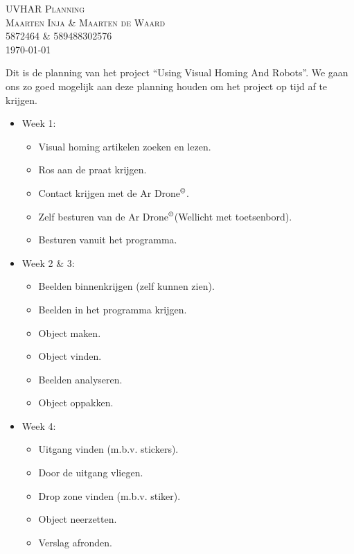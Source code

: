 \documentclass[10pt, titlepage, oneside, a4paper]{article}
\begin{document}
\newcommand{\Ardrone}{Ar Drone$^{\copyright}$}
\begin{center}
\textsc{\LARGE UVHAR Planning}\\[10pt]
\textsc{\Large Maarten Inja \& Maarten de Waard}\\[10pt]
\textsc{\large 5872464 \& 589488302576}\\
{\large \today}
\end{center}

Dit is de planning van het project ``Using Visual Homing And Robots''. We gaan ons zo goed mogelijk aan deze planning houden om het project op tijd af te krijgen.

\begin{itemize}     
\item Week 1:
\begin{itemize}     
\item Visual homing artikelen zoeken en lezen.
\item Ros aan de praat krijgen.
\item Contact krijgen met de \Ardrone.
\item Zelf besturen van de \Ardrone (Wellicht met toetsenbord).
\item Besturen vanuit het programma.
\end{itemize}
\item Week 2 \& 3: 
\begin{itemize}
\item Beelden binnenkrijgen (zelf kunnen zien).
\item Beelden in het programma krijgen.
\item Object maken.
\item Object vinden.
\item Beelden analyseren.
\item Object oppakken.
\end{itemize}
\item Week 4: 
\begin{itemize}
\item Uitgang vinden (m.b.v. stickers).
\item Door de uitgang vliegen.
\item Drop zone vinden (m.b.v. stiker).
\item Object neerzetten.
\item Verslag afronden.
\end{itemize}
\end{itemize}
\end{document}
